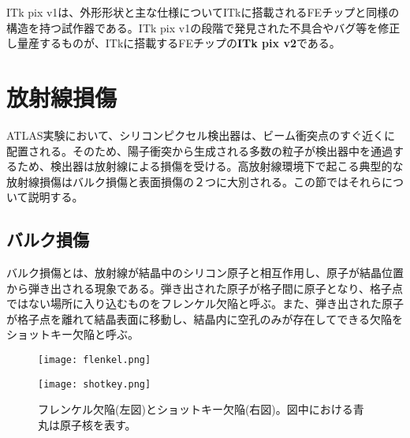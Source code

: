 ITk pix v1は、外形形状と主な仕様についてITkに搭載されるFEチップと同様の構造を持つ試作器である。ITk pix v1の段階で発見された不具合やバグ等を修正し量産するものが、ITkに搭載するFEチップの\textbf{ITk pix v2}である。



\section{放射線損傷}
\label{sec:houshasennsonnshou}
ATLAS実験において、シリコンピクセル検出器は、ビーム衝突点のすぐ近くに配置される。そのため、陽子衝突から生成される多数の粒子が検出器中を通過するため、検出器は放射線による損傷を受ける。高放射線環境下で起こる典型的な放射線損傷はバルク損傷と表面損傷の２つに大別される。この節ではそれらについて説明する。


\subsection{バルク損傷}
\label{sec:baruku}
バルク損傷とは、放射線が結晶中のシリコン原子と相互作用し、原子が結晶位置から弾き出される現象である。弾き出された原子が格子間に原子となり、格子点ではない場所に入り込むものをフレンケル欠陥と呼ぶ。また、弾き出された原子が格子点を離れて結晶表面に移動し、結晶内に空孔のみが存在してできる欠陥をショットキー欠陥と呼ぶ。
\begin{figure}[tbp]
  \begin{minipage}[b]{0.45\linewidth}
    \centering
    \texttt{[image: flenkel.png]}
  \end{minipage}
  \begin{minipage}[b]{0.45\linewidth}
    \centering
    \texttt{[image: shotkey.png]}
  \end{minipage}
  \caption[フレンケル欠陥とショットキー欠陥]{フレンケル欠陥(左図)とショットキー欠陥(右図)。図中における青丸は原子核を表す。}
  \label{fig:kekkan}
\end{figure}


